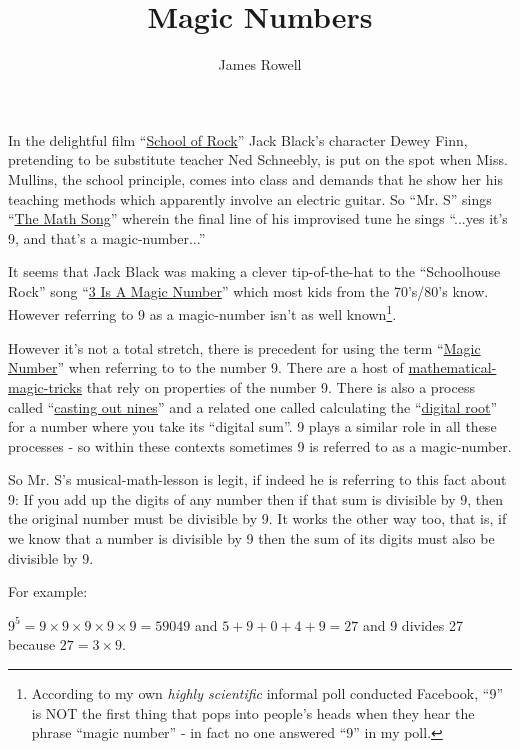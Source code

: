 \documentclass{article}
\title{Magic Numbers}
\author{James Rowell}
\newenvironment{jprIn}{\begin{adjustwidth}{2em}{}}{\end{adjustwidth}}
\begin{document}
\maketitle

In the delightful film ``\href{https://en.wikipedia.org/wiki/School_of_Rock}{School
of Rock}'' Jack Black's character Dewey Finn,
pretending to be substitute teacher Ned Schneebly, is put on the spot when
Miss. Mullins, the school principle, comes into class and demands that he show
her his teaching methods which apparently involve an electric guitar.
So ``Mr. S'' sings ``\href{https://www.youtube.com/watch?v=aa8U0nL-KXg}{The
Math Song}'' wherein the final line of his
improvised tune he sings ``...yes it's 9, and that's a magic-number...''

It seems that Jack Black was making a clever
tip-of-the-hat to the ``Schoolhouse Rock'' song ``\href{https://youtu.be/aU4pyiB-kq0}{3
Is A Magic Number}''
which most kids from the 70's/80's know.
However referring to 9 as a magic-number isn't
as well known\footnote{According to my own \emph{highly scientific}
informal poll conducted Facebook, %
``9'' is NOT the first thing that pops into people's heads when they
hear the phrase ``magic number'' - in fact no one answered ``9'' in my poll.}.

However it's not a total stretch, there is precedent
for using the term ``\href{http://mathworld.wolfram.com/MagicNumber.html}{Magic
Number}'' when referring to to the number 9.
There are a host of
\href{http://mathematics-in-europe.eu/?p=144}{mathematical-magic-tricks}
that rely on properties of the number 9.
There is also a process called
``\href{https://en.wikipedia.org/wiki/Casting_out_nines}{casting out nines}'' and a related one 
called calculating the
``\href{http://mathworld.wolfram.com/DigitalRoot.html}{digital root}''
for a number where you take its ``digital sum''. 9
plays a similar role in all these processes - so within these contexts sometimes 9
is referred to as a magic-number.

So Mr. S's musical-math-lesson is legit, if indeed he is referring to this fact about 9:
If you add up the digits of
any number then if that sum is divisible by 9, then the original number
must be divisible by 9. It works the other way too, that is, if we know
that a number is divisible by 9 then the sum of its digits must also be
divisible by 9.

For example:
\begin{jprIn}
$9^5=9\times{}9\times{}9\times{}9\times{}9=59049$
and $5+9+0+4+9=27$ and 9 divides 27 because $27 = 3\times{}9$.
\end{jprIn}
\end{document}
